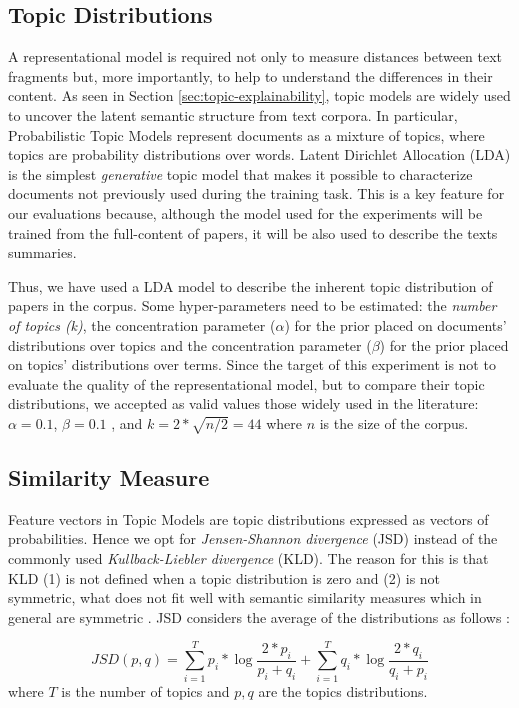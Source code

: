 \subsection{Topic Distributions}
\label{sec:topicmodel}
A representational model is required not only to measure distances between text fragments but, more importantly, to help to understand the differences in their content. As seen in Section \ref{sec:topic-explainability}, topic models are widely used to uncover the latent semantic structure from text corpora. In particular, Probabilistic Topic Models represent documents as a mixture of topics, where topics are probability distributions over words. Latent Dirichlet Allocation (LDA)\citep{Blei2003} is the simplest \textit{generative} topic model that makes it possible to characterize documents not previously used during the training task. This is a key feature for our evaluations because, although the model used for the experiments will be trained from the full-content of papers, it will be also used to describe the texts summaries.

Thus, we have used a LDA model to describe the inherent topic distribution of papers in the corpus. Some hyper-parameters need to be estimated: the \textit{number of topics (k)}, the  concentration parameter ($\alpha$) for the prior placed on documents' distributions over topics and the concentration parameter ($\beta$) for the prior placed on topics’ distributions over terms. Since the target of this experiment is not to evaluate the quality of the representational model, but to compare their topic distributions, we accepted as valid values those widely used in the literature: $\alpha=0.1$, $\beta=0.1$ , and $k=2*\sqrt{n/2}=44$ where $n$ is the size of the corpus.

\subsection{Similarity Measure}
Feature vectors in Topic Models are topic distributions expressed as vectors of probabilities. Hence we opt for \textit{Jensen-Shannon divergence} (JSD)\citep{Lin1991} instead of the commonly used \textit{Kullback-Liebler divergence} (KLD). The reason for this is that KLD (1) is not defined when a topic distribution is zero and (2) is not symmetric, what does not fit well with semantic similarity measures which in general are symmetric \citep{Rus2013}. JSD considers the average of the distributions as follows :

\begin{equation}
JSD(p,q) = \sum\limits_{i=1}^T p_{i}*\log \frac{2*p_{i}}{p_{i}+q_{i}}  +  \sum\limits_{i=1}^T q_{i}*\log \frac{2*q_{i}}{q_{i}+p_{i}}
\label{eq:jsd}
\end{equation}
where  $T$ is the number of topics and $p,q$ are the topics distributions.

